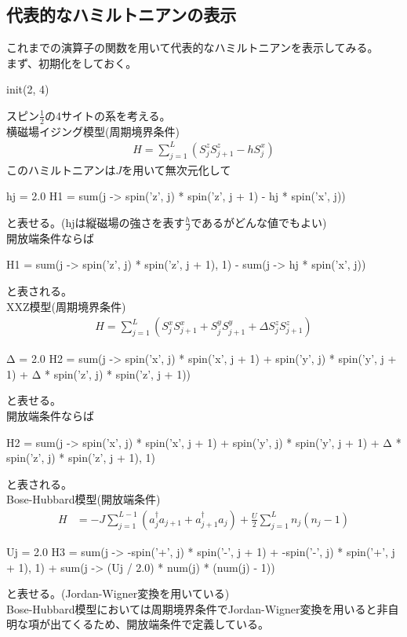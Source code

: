 \documentclass{ltjsarticle}
\begin{document}
\subsection*{代表的なハミルトニアンの表示}
これまでの演算子の関数を用いて代表的なハミルトニアンを表示してみる。\\
まず、初期化をしておく。
\begin{jllisting}
init(2, 4)
\end{jllisting}
スピン$\frac{1}{2}$の4サイトの系を考える。\\
横磁場イジング模型(周期境界条件)
\begin{gather}
  H = \sum_{j=1}^{L} \left( S^z_j S^z_{j+1} - h S^x_{j} \right)
\end{gather}
このハミルトニアンは$J$を用いて無次元化して
\begin{jllisting}
hj = 2.0
H1 = sum(j -> spin('z', j) * spin('z', j + 1) - hj * spin('x', j))
\end{jllisting}
と表せる。(hjは縦磁場の強さを表す$\frac{h}{J}$であるがどんな値でもよい)\\
開放端条件ならば
\begin{jllisting}
H1 = sum(j -> spin('z', j) * spin('z', j + 1), 1) - sum(j -> hj * spin('x', j))
\end{jllisting}
と表される。\\
XXZ模型(周期境界条件)
\begin{align}
  H = \sum_{j=1}^{L} \left( S^x_j S^x_{j+1} + S^y_j S^y_{j+1} + \Delta S^z_j S^z_{j+1} \right)
\end{align}
\begin{jllisting}
Δ = 2.0
H2 = sum(j -> spin('x', j) * spin('x', j + 1) + spin('y', j) * spin('y', j + 1) + Δ * spin('z', j) * spin('z', j + 1))
\end{jllisting}
と表せる。\\
開放端条件ならば
\begin{jllisting}
H2 = sum(j -> spin('x', j) * spin('x', j + 1) + spin('y', j) * spin('y', j + 1) + Δ * spin('z', j) * spin('z', j + 1), 1)
\end{jllisting}
と表される。\\
Bose-Hubbard模型(開放端条件)
\begin{align}
  H &= -J\sum_{j=1}^{L-1} \left( a_j^\dagger a_{j+1} + a_{j+1}^\dagger a_j \right) + \frac{U}{2}\sum_{j=1}^{L} n_j(n_j-1)
\end{align}
\begin{jllisting}
Uj = 2.0
H3 = sum(j -> -spin('+', j) * spin('-', j + 1) + -spin('-', j) * spin('+', j + 1), 1) + sum(j -> (Uj / 2.0) * num(j) * (num(j) - 1))
\end{jllisting}
と表せる。(Jordan-Wigner変換を用いている)\\
Bose-Hubbard模型においては周期境界条件でJordan-Wigner変換を用いると非自明な項が出てくるため、開放端条件で定義している。\\
\end{document}
